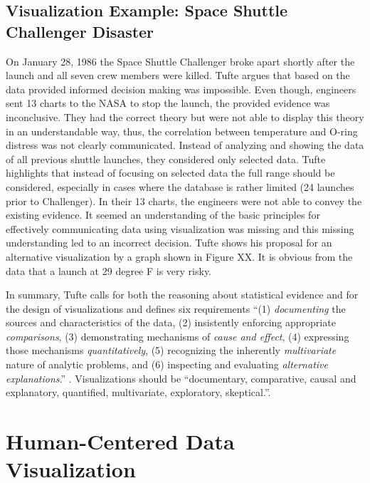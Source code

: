 \documentclass[
]{book}
\begin{document}
\hypertarget{visualization-example-space-shuttle-challenger-disaster}{%
\subsection{Visualization Example: Space Shuttle Challenger Disaster}\label{visualization-example-space-shuttle-challenger-disaster}}

On January 28, 1986 the Space Shuttle Challenger broke apart shortly after the launch and all seven crew members were killed. Tufte \citep{tufte1997visualexplanation} argues that based on the data provided informed decision making was impossible. Even though, engineers sent 13 charts to the NASA to stop the launch, the provided evidence was inconclusive. They had the correct theory but were not able to display this theory in an understandable way, thus, the correlation between temperature and O-ring distress was not clearly communicated. Instead of analyzing and showing the data of all previous shuttle launches, they considered only selected data. Tufte highlights that instead of focusing on selected data the full range should be considered, especially in cases where the database is rather limited (24 launches prior to Challenger). In their 13 charts, the engineers were not able to convey the existing evidence. It seemed an understanding of the basic principles for effectively communicating data using visualization was missing and this missing understanding led to an incorrect decision. Tufte shows his proposal for an alternative visualization by a graph shown in Figure XX. It is obvious from the data that a launch at 29 degree F is very risky.

In summary, Tufte calls for both the reasoning about statistical evidence and for the design of visualizations and defines six requirements ``(1) \emph{documenting} the sources and characteristics of the data, (2) insistently enforcing appropriate \emph{comparisons}, (3) demonstrating mechanisms of \emph{cause and effect}, (4) expressing those mechanisms \emph{quantitatively}, (5) recognizing the inherently \emph{multivariate} nature of analytic problems, and (6) inspecting and evaluating \emph{alternative explanations}.'' \citep{tufte1997visualexplanation}. Visualizations should be ``documentary, comparative, causal and explanatory, quantified, multivariate, exploratory, skeptical.''\citep{tufte1997visualexplanation}.

\hypertarget{sec:hcd}{%
\section{Human-Centered Data Visualization}\label{sec:hcd}}
\end{document}
